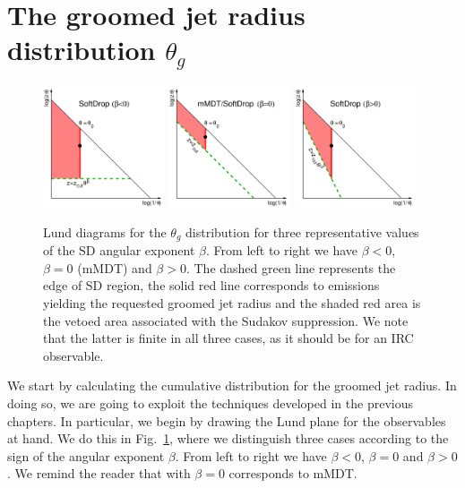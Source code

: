 \section{The groomed jet radius distribution $\theta_g$} \label{sec:thetag}
\begin{figure}[t]
    \centering
    \includegraphics[width=0.32\textwidth]{figures/Lund-SD-thetag-negb.pdf}
    \includegraphics[width=0.32\textwidth]{figures/Lund-SD-thetag-zerob.pdf}
    \includegraphics[width=0.32\textwidth]{figures/Lund-SD-thetag-posb.pdf}
  \caption{Lund diagrams for the $\theta_g$ distribution for three representative values of the SD angular exponent $\beta$. From left to right we have $\beta<0$, $\beta=0$ (mMDT) and $\beta>0$. 
  The dashed green line
    represents the edge of SD region, the solid red line corresponds to
    emissions yielding the requested groomed jet radius and the shaded red area is the vetoed area
    associated with the Sudakov suppression. We note that the latter
    is finite in all three cases, as it should be for an IRC
    observable. 
   }\label{fig:lund-sd-thetag}
\end{figure}


We start by calculating the cumulative distribution for the groomed jet radius. In doing so, we are going to exploit the techniques developed in the previous chapters. In particular, we begin by drawing the Lund plane for the observables at hand. We do this in Fig.~\ref{fig:lund-sd-thetag}, where we distinguish three cases according to the sign of the \SD angular exponent $\beta$. From left to right we have $\beta<0$, $\beta=0$ and $\beta>0$. We remind the reader that \SD with $\beta=0$ corresponds to mMDT. 


